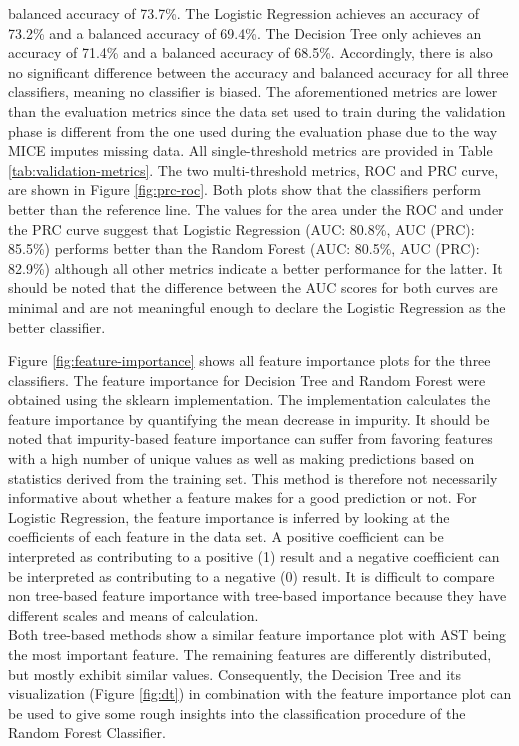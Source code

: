 balanced accuracy of 73.7\%. The Logistic Regression achieves an accuracy of 
73.2\% and a balanced accuracy of 69.4\%. The Decision Tree only achieves an 
accuracy of 71.4\% and a balanced accuracy of 68.5\%. Accordingly, there is 
also no significant difference between the accuracy and balanced accuracy for 
all three classifiers, meaning no classifier is biased.
The aforementioned metrics are lower than the evaluation metrics since the data 
set used to train during the validation phase is different from the one used 
during the evaluation phase due to the way MICE imputes missing data.
All single-threshold metrics are provided in Table \ref{tab:validation-metrics}.
The two multi-threshold metrics, ROC and PRC curve, are shown in Figure 
\ref{fig:prc-roc}. Both plots show that the classifiers perform better than the 
reference line. The values for the area under the ROC and under the PRC curve 
suggest that Logistic Regression (AUC: 80.8\%, AUC (PRC): 85.5\%) performs 
better than the Random Forest (AUC: 80.5\%, AUC (PRC): 82.9\%) although all 
other metrics indicate a better performance for the latter. It 
should be noted that the difference between the AUC scores for both curves are 
minimal and are not meaningful enough to declare the Logistic Regression as the 
better classifier.
\par
Figure \ref{fig:feature-importance} shows all feature importance plots for the 
three classifiers. The feature importance for Decision Tree and Random Forest 
were obtained using the sklearn implementation. The implementation calculates 
the feature importance by quantifying the mean decrease in impurity. 
It should be noted that impurity-based feature importance can suffer 
from favoring features with a high number of unique values as well as making 
predictions based on statistics derived from the training set. This method is 
therefore not necessarily informative about whether a feature makes for a 
good prediction or not.\cite{RN178}
For Logistic Regression, the feature importance is inferred by looking at the 
coefficients of each feature in the data set. A positive coefficient can be 
interpreted as contributing to a positive (1) result and a negative coefficient 
can be interpreted as contributing to a negative (0) result.
It is difficult to compare non tree-based feature importance with tree-based 
importance because they have different scales and means of calculation.
\\
Both tree-based methods show a similar feature importance plot with AST being 
the most important feature. The remaining features are differently distributed, 
but mostly exhibit similar values. Consequently, the Decision Tree and its 
visualization (Figure \ref{fig:dt}) in combination with the feature 
importance plot can be used to give some rough insights into the classification 
procedure of the Random Forest Classifier.

